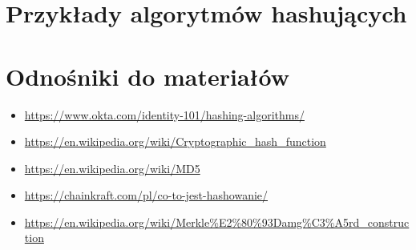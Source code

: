 \documentclass{article}
\begin{document}
\section{Przykłady algorytmów hashujących}




\section{Odnośniki do materiałów}
\begin{itemize}
    \item \url{https://www.okta.com/identity-101/hashing-algorithms/}
    \item \url{https://en.wikipedia.org/wiki/Cryptographic_hash_function}
    \item \url{https://en.wikipedia.org/wiki/MD5}
    \item \url{https://chainkraft.com/pl/co-to-jest-hashowanie/}
    \item \url{https://en.wikipedia.org/wiki/Merkle%E2%80%93Damg%C3%A5rd_construction}
\end{itemize}
\end{document}
